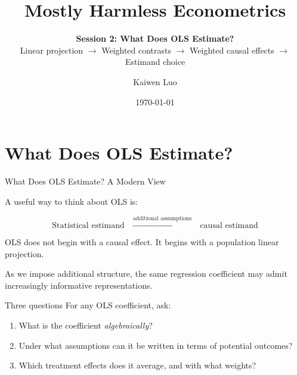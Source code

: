 \documentclass[aspectratio=169,11pt]{beamer}
\title{Mostly Harmless Econometrics}
\subtitle{
\textbf{Session 2: What Does OLS Estimate?}
\\[0.55em]
Linear projection
$\rightarrow$ Weighted contrasts
$\rightarrow$ Weighted causal effects
$\rightarrow$ Estimand choice
}
\author{Kaiwen Luo}
\institute{Washington University in St.Louis}
\date{\today}
\begin{document}
\begin{frame}
    \titlepage
\end{frame}



\section{What Does OLS Estimate?}

\begin{frame}{What Does OLS Estimate? A Modern View}
\small

A useful way to think about OLS is:

\[
\boxed{
\text{Statistical estimand}
\quad
\xrightarrow{\text{additional assumptions}}
\quad
\text{causal estimand}
}
\]

\medskip

OLS does \alert{not} begin with a causal effect. It begins with a
population linear projection.

\medskip

As we impose additional structure, the same regression coefficient
may admit increasingly informative representations.

\begin{block}{Three questions}
For any OLS coefficient, ask:
\begin{enumerate}
    \item What is the coefficient \emph{algebraically}?
    \item Under what assumptions can it be written in terms of potential outcomes?
    \item Which treatment effects does it average, and with what weights?
\end{enumerate}
\end{block}

\end{frame}
\end{document}
